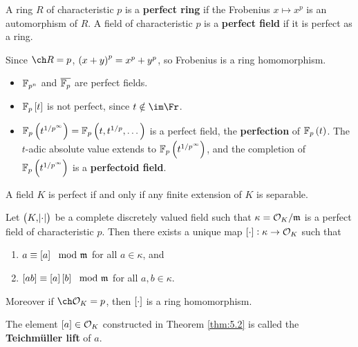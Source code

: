\begin{definition}
A ring $ R $ of characteristic $ p $ is a \textbf{perfect ring} if the Frobenius $ x \mapsto x^p $ is an automorphism of $ R $. A field of characteristic $ p $ is a \textbf{perfect field} if it is perfect as a ring.
\end{definition}

\begin{remark*}
Since $ \ch R = p $, $ \br{x + y}^p = x^p + y^p $, so Frobenius is a ring homomorphism.
\end{remark*}

\begin{example*}
\hfill
\begin{itemize}
\item $ \mathbb{F}_{p^n} $ and $ \overline{\mathbb{F}_p} $ are perfect fields.
\item $ \FF_p\sbr{t} $ is not perfect, since $ t \notin \im \Fr $.
\item $ \FF_p\br{t^{1 / p^\infty}} = \FF_p\br{t, t^{1 / p}, \dots} $ is a perfect field, the \textbf{perfection} of $ \FF_p\br{t} $. The $ t $-adic absolute value extends to $ \FF_p\br{t^{1 / p^\infty}} $, and the completion of $ \FF_p\br{t^{1 / p^\infty}} $ is a \textbf{perfectoid field}.
\end{itemize}
\end{example*}

\begin{fact*}
A field $ K $ is perfect if and only if any finite extension of $ K $ is separable.
\end{fact*}

\pagebreak

\begin{theorem}
\label{thm:5.2}
Let $ \br{K, \abs{\cdot}} $ be a complete discretely valued field such that $ \kappa = \mathcal{O}_K / \mathfrak{m} $ is a perfect field of characteristic $ p $. Then there exists a unique map $ \sbr{\cdot} : \kappa \to \OOO_K $ such that
\begin{enumerate}
\item $ a \equiv \sbr{a} \mod \mmm $ for all $ a \in \kappa $, and
\item $ \sbr{ab} \equiv \sbr{a}\sbr{b} \mod \mmm $ for all $ a, b \in \kappa $.
\end{enumerate}
Moreover if $ \ch \OOO_K = p $, then $ \sbr{\cdot} $ is a ring homomorphism.
\end{theorem}

\begin{definition}
The element $ \sbr{a} \in \OOO_K $ constructed in Theorem \ref{thm:5.2} is called the \textbf{Teichm\"uller lift} of $ a $.
\end{definition}

